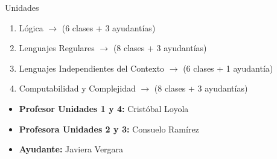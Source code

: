 \documentclass{beamer}
\begin{document}
\begin{frame}{Unidades}
  \begin{enumerate}
    \item Lógica $\rightarrow$ (6 clases + 3 ayudantías)
    \item Lenguajes Regulares $\rightarrow$ (8 clases + 3 ayudantías)
    \item Lenguajes Independientes del Contexto $\rightarrow$ (6 clases +
          1 ayudantía)
    \item Computabilidad y Complejidad $\rightarrow$ (8 clases + 3 ayudantías)
  \end{enumerate}

  \vspace{.5cm}
  \begin{itemize}
    \item \textbf{Profesor Unidades 1 y 4:} Cristóbal Loyola
    \item \textbf{Profesora Unidades 2 y 3:} Consuelo Ramírez
    \item \textbf{Ayudante:} Javiera Vergara
  \end{itemize}

\end{frame}
\end{document}
